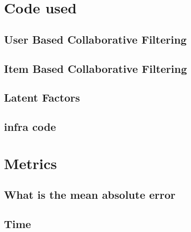 \section{Code used}
\subsection{User Based Collaborative Filtering}
\subsection{Item Based Collaborative Filtering}

\subsection{Latent Factors}

\subsection{infra code}


\section{Metrics}
\subsection{What is the mean absolute error}
\subsection{Time}
\listoftables
\newpage
\listoffigures